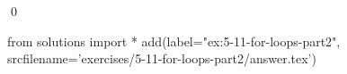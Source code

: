 
\begin{ex}
  \label{ex:5-11-for-loops-part2}
  
  \qed
\end{ex}
\begin{python0}
from solutions import *
add(label="ex:5-11-for-loops-part2",
    srcfilename='exercises/5-11-for-loops-part2/answer.tex')
\end{python0}
